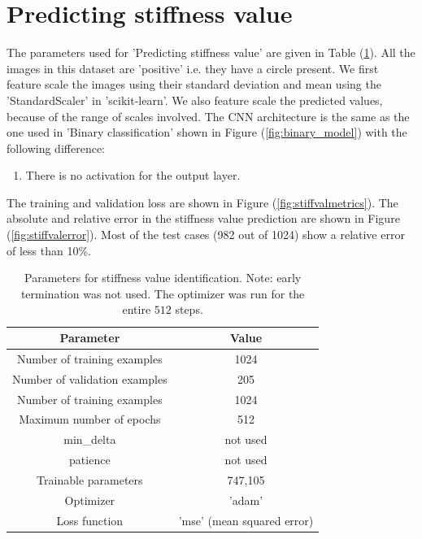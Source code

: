 \documentclass{article}
\begin{document}
\section{Predicting stiffness value}
The parameters used for 'Predicting stiffness value' are given in Table (\ref{tab:stiffvalparam}). All the images in this dataset are 'positive' i.e. they have a circle present. We first feature scale the images using their standard deviation and mean using the 'StandardScaler' in 'scikit-learn'. We also feature scale the predicted values, because of the range of scales involved. The CNN architecture is the same as the one used in 'Binary classification' shown in Figure (\ref{fig:binary_model}) with the following difference:
%
\begin{enumerate}
\item{There is no activation for the output layer.}
\end{enumerate}
The training and validation loss are shown in Figure (\ref{fig:stiffvalmetrics}). The absolute and relative error in the stiffness value prediction are shown in Figure (\ref{fig:stiffvalerror}). Most of the test cases (982 out of 1024) show a relative error of less than 10\%. 
%
\begin{table}
  \centering
  \begin{tabular}{|c|c|}
    \hline
    Parameter & Value \\
    \hline
    Number of training examples   & 1024 \\
    Number of validation examples & 205 \\
    Number of training examples   & 1024 \\
    Maximum number of epochs      & 512 \\
    min{\_}delta      & not used\\
    patience                      & not used  \\
    Trainable parameters          & 747,105\\
    Optimizer         & 'adam'     \\
    Loss function     & 'mse' (mean squared error) \\
    \hline
  \end{tabular}
  \caption{\label{tab:stiffvalparam} Parameters for stiffness value identification. Note: early termination was not used. The optimizer was run for the entire $512$ steps.}
\end{table}
%
\end{document}

